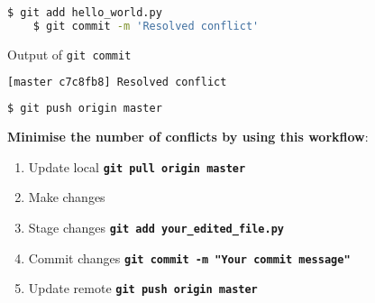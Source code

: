 \begin{frame}[fragile]
\emptyframetitle

  \begin{lstlisting}[language=bash]
    $ git add hello_world.py 
    $ git commit -m 'Resolved conflict'
  \end{lstlisting}

  \vspace*{-0.25cm}
  \begin{block}{Output of \texttt{git commit}}
  \vspace*{-0.25cm}
    \begin{lstlisting}[language=bash]
      [master c7c8fb8] Resolved conflict
    \end{lstlisting}
  \end{block}
 
  \vspace*{-0.25cm}
  \begin{lstlisting}[language=bash]
    $ git push origin master 
  \end{lstlisting}

  \vspace*{0.25cm}

  \textbf{Minimise the number of conflicts by using this workflow}:

  \begin{enumerate}
    \item Update local \hspace*{0.25cm} \texttt{\textbf{git pull origin master}}
    \item Make changes	
    \item Stage changes \hspace*{0.25cm} \texttt{\textbf{git add your\_edited\_file.py}}
    \item Commit changes \hspace*{0.25cm} \texttt{\textbf{git commit -m "Your commit message"}}
    \item Update remote \hspace*{0.25cm} \texttt{\textbf{git push origin master}}
  \end{enumerate}

\end{frame}

